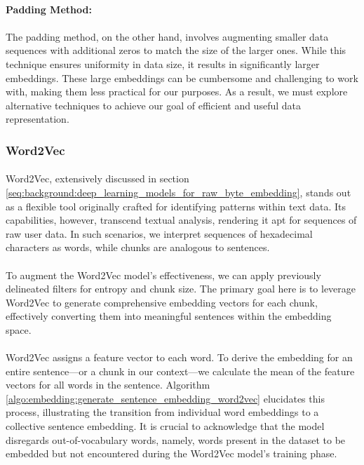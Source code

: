         \paragraph{Padding Method:}
        \paragraph{}The padding method, on the other hand, involves augmenting smaller data sequences with additional zeros to match the size of the larger ones. While this technique ensures uniformity in data size, it results in significantly larger embeddings. These large embeddings can be cumbersome and challenging to work with, making them less practical for our purposes. As a result, we must explore alternative techniques to achieve our goal of efficient and useful data representation.
    
    \subsubsection{Word2Vec}
        \paragraph{}Word2Vec, extensively discussed in section \ref{seq:background:deep_learning_models_for_raw_byte_embedding}, stands out as a flexible tool originally crafted for identifying patterns within text data. Its capabilities, however, transcend textual analysis, rendering it apt for sequences of raw user data. In such scenarios, we interpret sequences of hexadecimal characters as words, while chunks are analogous to sentences.

        \paragraph{}To augment the Word2Vec model's effectiveness, we can apply previously delineated filters for entropy and chunk size. The primary goal here is to leverage Word2Vec to generate comprehensive embedding vectors for each chunk, effectively converting them into meaningful sentences within the embedding space.
        
        \paragraph{}Word2Vec assigns a feature vector to each word. To derive the embedding for an entire sentence—or a chunk in our context—we calculate the mean of the feature vectors for all words in the sentence. Algorithm \ref{algo:embedding:generate_sentence_embedding_word2vec} elucidates this process, illustrating the transition from individual word embeddings to a collective sentence embedding. It is crucial to acknowledge that the model disregards out-of-vocabulary words, namely, words present in the dataset to be embedded but not encountered during the Word2Vec model's training phase.


